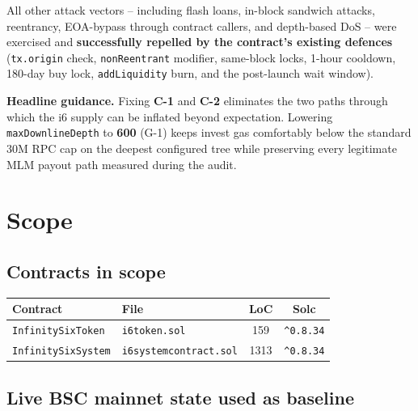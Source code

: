 \documentclass[11pt,a4paper]{article}
\begin{document}
All other attack vectors -- including flash loans, in-block sandwich attacks,
reentrancy, EOA-bypass through contract callers, and depth-based DoS -- were
exercised and \textbf{successfully repelled by the contract's existing
defences} (\texttt{tx.origin} check, \texttt{nonReentrant} modifier, same-block
locks, 1-hour cooldown, 180-day buy lock, \texttt{addLiquidity} burn, and the
post-launch wait window).

\vspace{0.4cm}
\begin{infobox}
\textbf{Headline guidance.} Fixing \textbf{C-1} and \textbf{C-2} eliminates the
two paths through which the i6 supply can be inflated beyond expectation.
Lowering \texttt{maxDownlineDepth} to \textbf{600} (G-1) keeps invest gas
comfortably below the standard 30M RPC cap on the deepest configured tree
while preserving every legitimate MLM payout path measured during the audit.
\end{infobox}

\newpage

\section{Scope}

\subsection{Contracts in scope}

\begin{center}
\renewcommand{\arraystretch}{1.3}
\begin{tabular}{p{4.4cm} p{4.4cm} c c}
\toprule
\textbf{Contract} & \textbf{File} & \textbf{LoC} & \textbf{Solc} \\
\midrule
\texttt{InfinitySixToken}  & \texttt{i6token.sol}            & 159  & \texttt{\^{}0.8.34} \\
\texttt{InfinitySixSystem} & \texttt{i6systemcontract.sol}   & 1313 & \texttt{\^{}0.8.34} \\
\bottomrule
\end{tabular}
\end{center}

\subsection{Live BSC mainnet state used as baseline}
\end{document}
